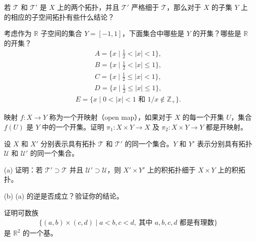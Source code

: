 \documentclass[../../main.tex]{subfiles}
\begin{document}
\begin{exercise}\label{exercise:ch02-子空间拓扑-2}
若 $\mathcal{T}$ 和 $\mathcal{T}'$ 是 $X$ 上的两个拓扑，并且 $\mathcal{T}'$ 严格细于 $\mathcal{T}$，那么对于 $X$ 的子集 $Y$ 上的相应的子空间拓扑有些什么结论？
\end{exercise}

\begin{exercise}\label{exercise:ch02-子空间拓扑-3}
考虑作为 $\mathbb{R}$ 子空间的集合 $Y = [-1, 1]$，下面集合中哪些是 $Y$ 的开集？哪些是 $\mathbb{R}$ 的开集？
\begin{align*}
A = \{x \mid \frac{1}{2} < |x| < 1\},
\end{align*}
\begin{align*}
B = \{x \mid \frac{1}{2} < |x| \leqslant 1\},
\end{align*}
\begin{align*}
C = \{x \mid \frac{1}{2} \leqslant |x| < 1\},
\end{align*}
\begin{align*}
D = \{x \mid \frac{1}{2} \leqslant |x| \leqslant 1\},
\end{align*}
\begin{align*}
E = \{x \mid 0 < |x| < 1 \text{ 和 } 1/x \notin \mathbb{Z}_{+}\}.
\end{align*}
\end{exercise}

\begin{exercise}\label{exercise:ch02-子空间拓扑-4}
映射 $f: X \rightarrow Y$ 称为一个开映射（open map），如果对于 $X$ 的每一个开集 $U$，集合 $f(U)$ 是 $Y$ 中的一个开集。证明 $\pi_{1}: X \times Y \rightarrow X$ 及 $\pi_{2}: X \times Y \rightarrow Y$ 都是开映射。
\end{exercise}

\begin{exercise}\label{exercise:ch02-子空间拓扑-5}
设 $X$ 和 $X'$ 分别表示具有拓扑 $\mathcal{T}$ 和 $\mathcal{T}'$ 的同一个集合。$Y$ 和 $Y'$ 表示分别具有拓扑 $\mathcal{U}$ 和 $\mathcal{U}'$ 的同一个集合。

(a) 证明：若 $\mathcal{T}' \supset \mathcal{T}$ 并且 $\mathcal{U}' \supset \mathcal{U}$，则 $X' \times Y'$ 上的积拓扑细于 $X \times Y$ 上的积拓扑。

(b) (a) 的逆是否成立？验证你的结论。
\end{exercise}

\begin{exercise}\label{exercise:ch02-子空间拓扑-6}
证明可数族
\begin{align*}
\{(a, b) \times (c, d) \mid a < b, c < d, \ \text{其中 } a, b, c, d \text{ 都是有理数}\}
\end{align*}
是 $\mathbb{R}^{2}$ 的一个基。
\end{exercise}
\end{document}
